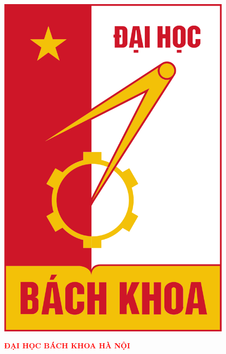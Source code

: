 \begin{titlepage}
    
\thispagestyle{myfooter}
\indent \vspace{2cm}
\begin{figure}[ht]
  \centering
  \hspace{0.5cm}
  \begin{minipage}[b]{0.09\textwidth}
    \includegraphics[width=\textwidth]{photo/hust.png}
  \end{minipage}
  \hspace{0.75cm}
  \begin{minipage}[b]{0.8\textwidth}
    \indent\textbf{\textcolor{red}{\Large ĐẠI HỌC BÁCH KHOA HÀ NỘI }}
\\\\
\indent{\textcolor{gray}{\large HANOI UNIVERSITY OF SCIENCE ADN TECHNOLOGY }}
  \end{minipage}
\end{figure}


\end{titlepage}
